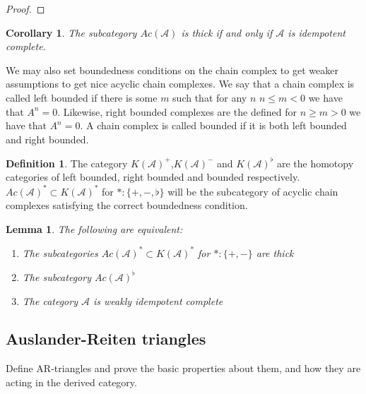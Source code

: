 \documentclass[11pt]{article}
\newtheorem{corollary}{Corollary}[theorem]
\newtheorem{lemma}[theorem]{Lemma}
\theoremstyle{definition}
\newtheorem{definition}{Definition}[section]
\theoremstyle{remark}
\begin{document}
            \begin{proof}
                
            \end{proof}

            \begin{corollary}
                The subcategory $Ac(\mathcal{A})$ is thick if and only if $\mathcal{A}$ is idempotent complete.
            \end{corollary}

            We may also set boundedness conditions on the chain complex to get weaker assumptions to get nice acyclic chain complexes. We say that a chain complex is called left bounded if there is some $m$ such that for any $n$ $n\leq m<0$ we have that $A^n = 0$. Likewise, right bounded complexes are the defined for $n\geq m>0$ we have that $A^n=0$. A chain complex is called bounded if it is both left bounded and right bounded. 

            \begin{definition}
                The category $K(\mathcal{A})^+$,$K(\mathcal{A})^-$ and $K(\mathcal{A})^{\flat}$ are the homotopy categories of left bounded, right bounded and bounded respectively. $Ac(\mathcal{A})^* \subset K(\mathcal{A})^*$ for $*:\{+,-,\flat\}$ will be the subcategory of acyclic chain complexes satisfying the correct boundedness condition.
            \end{definition}

            \begin{lemma}
                The following are equivalent:
                \begin{enumerate}
                    \item The subcategories $Ac(\mathcal{A})^* \subset K(\mathcal{A})^*$ for $*:\{+,-\}$ are thick
                    \item The subcategory $Ac(\mathcal{A})^{\flat}$
                    \item The category $\mathcal{A}$ is weakly idempotent complete
                \end{enumerate}
            \end{lemma}

        \subsection{Auslander-Reiten triangles}

            Define AR-triangles and prove the basic properties about them, and how they are acting in the derived category.
            
\end{document}
